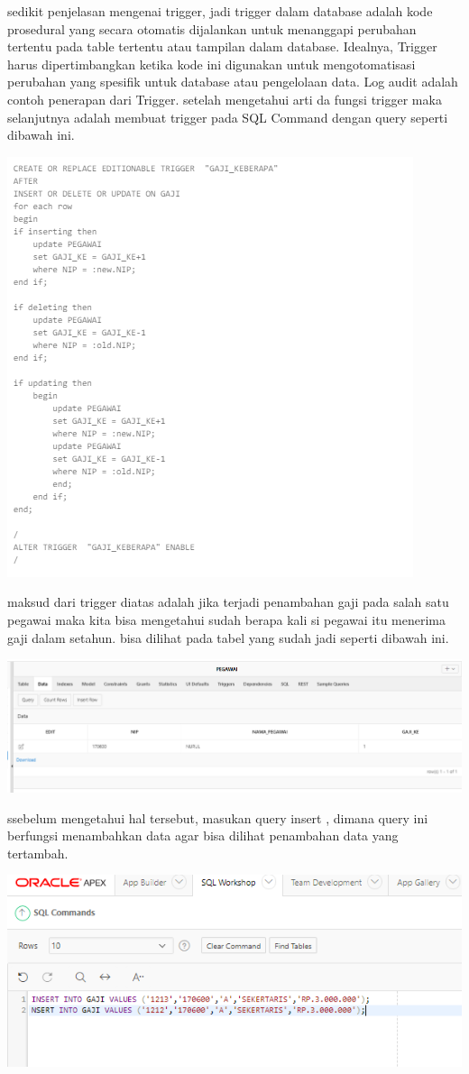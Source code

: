 \documentclass{article}
\begin{document}
\begin{enumerate}
    sedikit penjelasan mengenai trigger, jadi trigger dalam database adalah kode prosedural yang secara otomatis dijalankan untuk menanggapi perubahan tertentu pada table tertentu atau tampilan dalam database. Idealnya, Trigger harus dipertimbangkan ketika kode ini digunakan untuk mengotomatisasi perubahan yang spesifik untuk database atau pengelolaan data. Log audit adalah contoh penerapan dari Trigger.
    setelah mengetahui arti da fungsi trigger maka selanjutnya adalah membuat trigger pada SQL Command dengan query seperti dibawah ini.
    \begin{center}
    \includegraphics[width=.6\textwidth]{gambar/enam.PNG}
    \end{center}
    maksud dari trigger diatas adalah jika terjadi penambahan gaji pada salah satu pegawai maka kita bisa mengetahui sudah berapa kali si pegawai itu menerima gaji dalam setahun. 
    bisa dilihat pada tabel yang sudah jadi seperti dibawah ini.
     \begin{center}
    \includegraphics[width=.6\textwidth]{gambar/sembilan.PNG}
    \end{center}
    ssebelum mengetahui hal tersebut, masukan query insert , dimana query ini berfungsi menambahkan data agar bisa dilihat penambahan data yang tertambah.
     \begin{center}
    \includegraphics[width=.6\textwidth]{gambar/delapan.PNG}

\end{center}
\end{enumerate}
\end{document}
